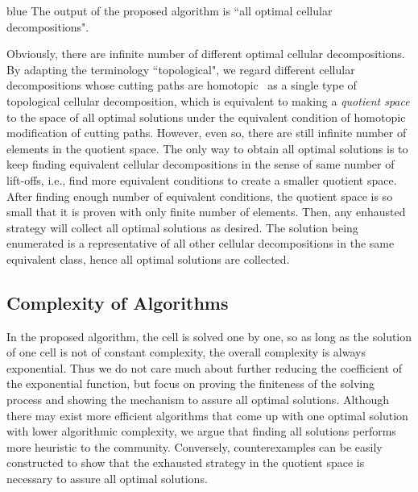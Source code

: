 \documentclass[Afour,sageh,times]{sagej}
\begin{document}
\begin{color}{blue}
The output of the proposed algorithm is ``all optimal cellular decompositions". 

Obviously, there are infinite number of different optimal cellular decompositions. 
By adapting the terminology ``topological", we regard different cellular decompositions whose cutting paths are homotopic~\cite{Simmons1964Introduction} as a single type of topological cellular decomposition, which is equivalent to making a \textit{quotient space} to the space of all optimal solutions under the equivalent condition of homotopic modification of cutting paths. 
However, even so, there are still infinite number of elements in the quotient space. 
The only way to obtain all optimal solutions is to keep finding equivalent cellular decompositions in the sense of same number of lift-offs, i.e., find more equivalent conditions to create a smaller quotient space. After finding enough number of equivalent conditions, the quotient space is so small that it is proven with only finite number of elements. Then, any enhausted strategy will collect all optimal solutions as desired. The solution being enumerated is a representative of all other cellular decompositions in the same equivalent class, hence all optimal solutions are collected. 

\subsection{Complexity of Algorithms}
In the proposed algorithm, the cell is solved one by one, so as long as the solution of one cell is not of constant complexity, the overall complexity is always exponential. Thus we do not care much about further reducing the coefficient of the exponential function, but focus on proving the finiteness of the solving process and showing the mechanism to assure all optimal solutions. 
Although there may exist more efficient algorithms that come up with one optimal solution with lower algorithmic complexity, we argue that finding all solutions performs more heuristic to the community. 
Conversely, counterexamples can be easily constructed to show that the exhausted strategy in the quotient space is necessary to assure all optimal solutions. 





\end{color}
\end{document}
